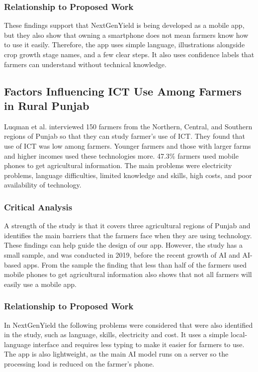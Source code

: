 \documentclass{FastFyp}
\begin{document}
\subsubsection{Relationship to Proposed Work}
These findings support that NextGenYield is being developed as a mobile app, but they also show that owning a smartphone does not mean farmers know how to use it easily. Therefore, the app uses simple language, illustrations alongside crop growth stage names, and a few clear steps. It also uses confidence labels that farmers can understand without technical knowledge.

\subsection{Factors Influencing ICT Use Among Farmers in Rural Punjab}

Luqman et al. \cite{ref:Luqman:2019} interviewed 150 farmers from the Northern, Central, and Southern regions of Punjab so that they can study farmer’s use of ICT. They found that use of ICT was low among farmers. Younger farmers and those with larger farms and higher incomes used these technologies more. 47.3\% farmers used mobile phones to get agricultural information. The main problems were electricity problems, language difficulties, limited knowledge and skills, high costs, and poor availability of technology.

\subsubsection{Critical Analysis}
A strength of the study is that it covers three agricultural regions of Punjab and identifies the main barriers that the farmers face when they are using technology. These findings can help guide the design of our app. However, the study has a small sample, and was conducted in 2019, before the recent growth of AI and AI-based apps. From the sample the finding that less than half of the farmers used mobile phones to get agricultural information also shows that not all farmers will easily use a mobile app.

\subsubsection{Relationship to Proposed Work}
In NextGenYield the following problems were considered that were also identified in the study, such as language, skills, electricity and cost. It uses a simple local-language interface and requires less typing to make it easier for farmers to use. The app is also lightweight, as the main AI model runs on a server so the processing load is reduced on the farmer's phone.
\end{document}
